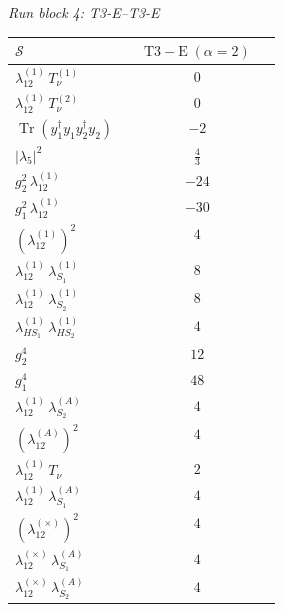 \documentclass[9pt]{article}
\begin{document}
\textit{Run block 4: T3-E--T3-E}
\begin{longtable}{@{}p{0.31\linewidth}c@{}}
\toprule
$\mathcal{S}$ & $ \mathrm{T3-E}\;(\alpha=2) $ \\
\midrule
$ \lambda_{12}^{(1)}\,T_{\nu}^{(1)} $ & $0$ \\
$ \lambda_{12}^{(1)}\,T_{\nu}^{(2)} $ & $0$ \\
$ \operatorname{Tr}(y_1^\dagger y_1y_2^\dagger y_2) $ & $ -2 $ \\
$ |\lambda_5|^2 $ & $ \frac{4}{3} $ \\
$ g_2^2\,\lambda_{12}^{(1)} $ & $ -24 $ \\
$ g_1^2\,\lambda_{12}^{(1)} $ & $ -30 $ \\
$ \left(\lambda_{12}^{(1)}\right)^2 $ & $ 4 $ \\
$ \lambda_{12}^{(1)}\,\lambda_{S_1}^{(1)} $ & $ 8 $ \\
$ \lambda_{12}^{(1)}\,\lambda_{S_2}^{(1)} $ & $ 8 $ \\
$ \lambda_{HS_1}^{(1)}\,\lambda_{HS_2}^{(1)} $ & $ 4 $ \\
$ g_2^4 $ & $ 12 $ \\
$ g_1^4 $ & $ 48 $ \\
$ \lambda_{12}^{(1)}\,\lambda_{S_2}^{(A)} $ & $ 4 $ \\
$ \left(\lambda_{12}^{(A)}\right)^2 $ & $ 4 $ \\
$ \lambda_{12}^{(1)}\,T_\nu $ & $ 2 $ \\
$ \lambda_{12}^{(1)}\,\lambda_{S_1}^{(A)} $ & $ 4 $ \\
$ \left(\lambda_{12}^{(\times)}\right)^2 $ & $ 4 $ \\
$ \lambda_{12}^{(\times)}\,\lambda_{S_1}^{(A)} $ & $ 4 $ \\
$ \lambda_{12}^{(\times)}\,\lambda_{S_2}^{(A)} $ & $ 4 $ \\
\bottomrule
\end{longtable}
\end{document}
